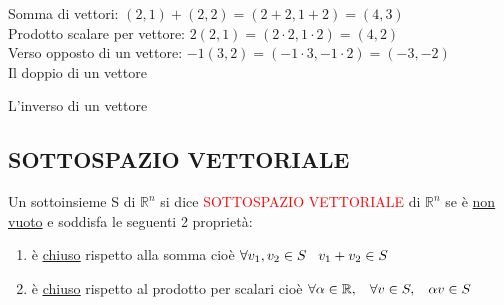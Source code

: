 \textsf{\small Somma di vettori: $(2,1) + (2,2) = (2 + 2, 1 + 2) = (4,3)$} \\
\textsf{\small Prodotto scalare per vettore: $2(2,1) = (2 \cdot 2, 1 \cdot 2) = (4,2)$} \\
\textsf{\small Verso opposto di un vettore: $-1(3,2) = (-1 \cdot 3, -1 \cdot 2) = (-3, -2)$} \\
\textsf{\small Il doppio di un vettore}
\textsf{\small L'inverso di un vettore}


\newpage

\subsection{SOTTOSPAZIO VETTORIALE}

\begin{definition}
	Un sottoinsieme S di $\mathbb{R}^n$ si dice \textcolor{red}{SOTTOSPAZIO VETTORIALE} di $\mathbb{R}^n$ se è \underline{non vuoto} e soddisfa le seguenti 2 proprietà:
	\begin{enumerate}
		\item \textsf{\small è \underline{\underline{chiuso}} rispetto alla somma cioè $\forall v_1, v_2 \in S \hspace{0.3cm} v_1 + v_2 \in S$ }
		\item \textsf{\small è \underline{\underline{chiuso}} rispetto al prodotto per scalari cioè $\forall \alpha \in \mathbb{R}, \hspace{0.3cm}\forall v \in S ,\hspace{0.3cm} \alpha v \in S$ }
	\end{enumerate}
\end{definition}

